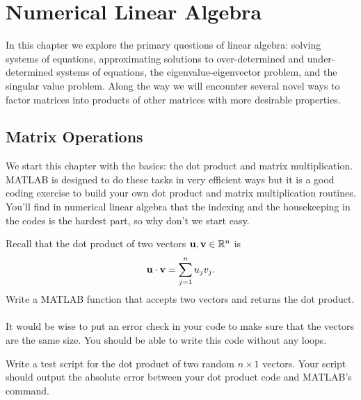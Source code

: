 \chapter{Numerical Linear Algebra}
In this chapter we explore the primary questions of linear algebra: solving systems of
equations, approximating solutions to over-determined and under-determined systems of
equations, the eigenvalue-eigenvector problem, and the singular value problem. Along the
way we will encounter several novel ways to factor matrices into products of other
matrices with more desirable properties.


\section{Matrix Operations}
We start this chapter with the basics: the dot product and matrix multiplication.  MATLAB
is designed to do these tasks in very efficient ways but it is a good coding exercise to
build your own dot product and matrix multiplication routines.  You'll find in numerical
linear algebra that the indexing and the housekeeping in the codes is the hardest part, so
why don't we start easy.

\begin{problem}
    Recall that the dot product of two vectors ${\bf u}, {\bf v} \in \mathbb{R}^n$ is 
    \[ {\bf u} \cdot {\bf v} = \sum_{j=1}^n u_j v_j. \]
    Write a MATLAB function that accepts two vectors and returns the dot product. \\
     \\
    It would be wise to put an error check in your code to make sure that the vectors are
    the same size.  You should be able to write this code without any loops.
\end{problem}

\begin{problem}
    Write a test script for the dot product of two random $n \times 1$ vectors.  Your
    script should output the absolute error between your dot product code and MATLAB's
    command.
\end{problem}


